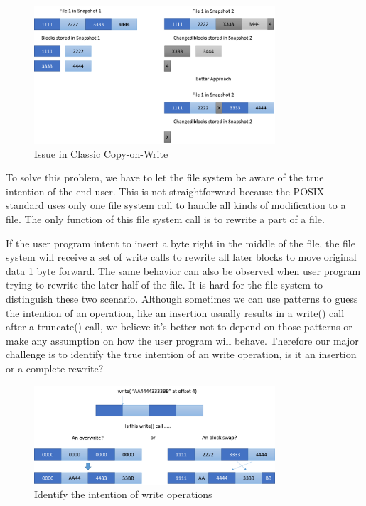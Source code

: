 \begin{figure}[hbtp]
\centering
\includegraphics[width=0.8\textwidth]{Chapter-4/figs/fig5.png}
\caption{Issue in Classic Copy-on-Write}
\label{fig:issue_classic_cow}
\end{figure}
 
    To solve this problem, we have to let the file system be aware of the true intention of the end user. This is not straightforward because the POSIX standard uses only one file system call to handle all kinds of modification to a file. The only function of this file system call is to rewrite a part of a file.
    
    If the user program intent to insert a byte right in the middle of the file, the file system will receive a set of write calls to rewrite all later blocks to move original data 1 byte forward. The same behavior can also be observed when user program trying to rewrite the later half of the file. It is hard for the file system to distinguish these two scenario. Although sometimes we can use patterns to guess the intention of an operation, like an insertion usually results in a write() call after a truncate() call, we believe it’s better not to depend on those patterns or make any assumption on how the user program will behave. Therefore our major challenge is to identify the true intention of an write operation, is it an insertion or a complete rewrite?

\begin{figure}[hbtp]
\centering
\includegraphics[width=0.8\textwidth]{Chapter-4/figs/fig6.png}
\caption{Identify the intention of write operations}
\label{fig:write_intention}
\end{figure}

